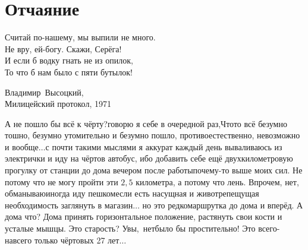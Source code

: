 \chapter{Отчаяние} 
\vepsianrose

\setlength{\epigraphwidth}{0.7\textwidth}

\epigraph{%
	Считай по-нашему, мы выпили не много.\mdash\\
	Не вру, ей-богу. Скажи, Серёга!\\
	И если б водку гнать не из опилок,\\
	То что б нам было с пяти бутылок!}
	{
	\begin{flushright}
		\small{Владимир~Высоцкий,\\Милицейский протокол, 1971}
	\end{flushright}
	}


\diagdash А не пошло бы всё к чёрту?\mdash говорю я себе в очередной раз,\mdash Что\sdash то всё безумно тошно, безумно утомительно и безумно пошло, противоестественно, невозможно и вообще$\ldots$\mdash с почти такими мыслями я аккурат каждый день вываливаюсь из электрички и иду на чёртов автобус, ибо добавить себе ещё двухкилометровую прогулку от станции до дома вечером после работы\mdash почему-то выше моих сил.
Не потому что не могу пройти эти ${2,5}$ километра, а потому что лень. Впрочем, нет, обманываю\mdash иногда иду пешком\mdash если есть насущная и животрепещущая необходимость заглянуть в магазин$\ldots$ но это редко\mdash маршрутка до дома и вперёд. %
А дома что? Дома принять горизонтальное положение, растянуть свои кости и усталые мышцы. Это старость? Увы,~нет\mdash было бы простительно! Это всего-навсего только чёртовых 27 лет$\ldots$

